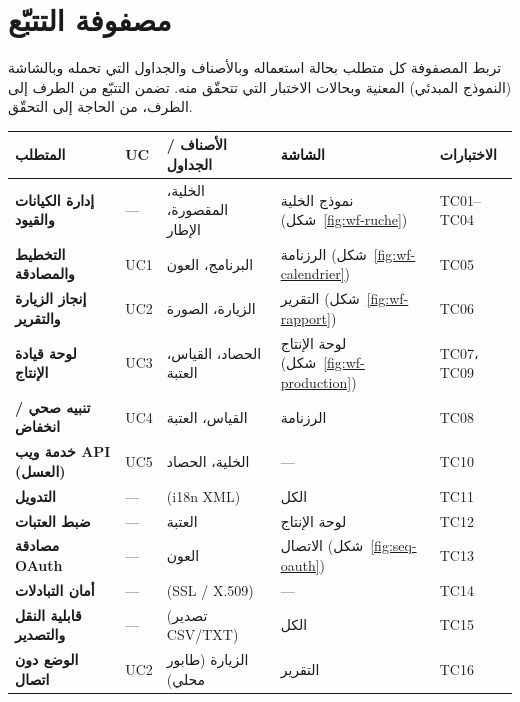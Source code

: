 \section{مصفوفة التتبّع}
تربط المصفوفة كل متطلب بحالة استعماله وبالأصناف والجداول التي تحمله وبالشاشة
(النموذج المبدئي) المعنية وبحالات الاختبار التي تتحقّق منه. تضمن التتبّع من
الطرف إلى الطرف، من الحاجة إلى التحقّق.
{\small
\begin{xltabular}{\textwidth}{>{\bfseries}X C{1.3cm} p{3.3cm} p{2.5cm} p{2.6cm}}
\toprule
\textbf{المتطلب} & \textbf{UC} & \textbf{الأصناف / الجداول} & \textbf{الشاشة} & \textbf{الاختبارات} \\
\midrule
\endhead
إدارة الكيانات والقيود & --- & الخلية، المقصورة، الإطار & نموذج الخلية (شكل~\ref{fig:wf-ruche}) & TC01--TC04 \\
التخطيط والمصادقة & UC1 & البرنامج، العون & الرزنامة (شكل~\ref{fig:wf-calendrier}) & TC05 \\
إنجاز الزيارة والتقرير & UC2 & الزيارة، الصورة & التقرير (شكل~\ref{fig:wf-rapport}) & TC06 \\
لوحة قيادة الإنتاج & UC3 & الحصاد، القياس، العتبة & لوحة الإنتاج (شكل~\ref{fig:wf-production}) & TC07، TC09 \\
تنبيه صحي / انخفاض & UC4 & القياس، العتبة & الرزنامة & TC08 \\
خدمة ويب API (العسل) & UC5 & الخلية، الحصاد & --- & TC10 \\
التدويل & --- & (i18n XML) & الكل & TC11 \\
ضبط العتبات & --- & العتبة & لوحة الإنتاج & TC12 \\
مصادقة OAuth & --- & العون & الاتصال (شكل~\ref{fig:seq-oauth}) & TC13 \\
أمان التبادلات & --- & (SSL / X.509) & --- & TC14 \\
قابلية النقل والتصدير & --- & (تصدير CSV/TXT) & الكل & TC15 \\
الوضع دون اتصال & UC2 & الزيارة (طابور محلي) & التقرير & TC16 \\
\bottomrule
\end{xltabular}}
